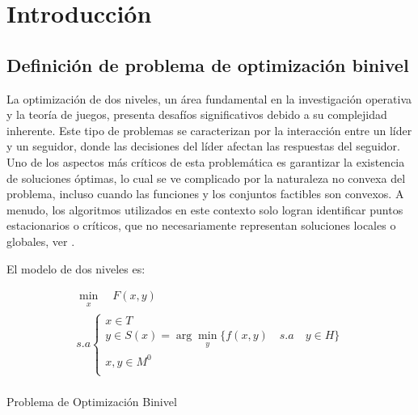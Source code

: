 \chapter{Introducción}
\section{Definición de problema de optimización binivel}
La optimización de dos niveles, un área fundamental en la investigación operativa y la teoría de juegos, presenta desafíos significativos debido a su complejidad inherente. Este tipo de problemas se caracterizan por la interacción entre un líder y un seguidor, donde las decisiones del líder afectan las respuestas del seguidor. Uno de los aspectos más críticos de esta problemática es garantizar la existencia de soluciones óptimas, lo cual se ve complicado por la naturaleza no convexa del problema, incluso cuando las funciones y los conjuntos factibles son convexos. A menudo, los algoritmos utilizados en este contexto solo logran identificar puntos estacionarios o críticos, que no necesariamente representan soluciones locales o globales, ver \cite{DempeyZemkoho2020}.


El modelo de dos niveles es:

\begin{table}[H]

    \[\begin{array}{l}
        \underset{\substack{x}}{\min} \quad F(x, y)\\
        s.a \left\{ \begin{array}{l}
            x \in T \\
             y \in S(x) = \arg  \underset{\substack{y}}{\min} \{ f(x, y) \quad s.a \quad y \in  H \}\\
            x,y \in M^0 \\
        \end{array}\right.
        \tag{\theequation}
        \label{eq:Def1Binivel}
    \end{array}\]\\


    \caption*{Problema de Optimización Binivel}
    \end{table}

